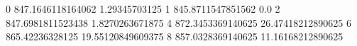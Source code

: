 0 847.1646118164062 1.29345703125
1 845.8711547851562 0.0
2 847.6981811523438 1.8270263671875
4 872.3453369140625 26.47418212890625
6 865.42236328125 19.55120849609375
8 857.0328369140625 11.16168212890625
